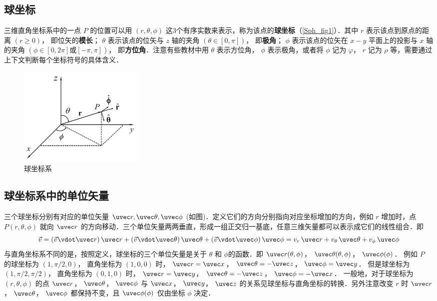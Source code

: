 

\subsection{球坐标}

三维直角坐标系中的一点 $P$ 的位置可以用 $(r,\theta ,\phi )$ 这3个有序实数来表示，称为该点的\textbf{球坐标}（\autoref{Sph_fig1}）．其中 $r$ 表示该点到原点的距离 $(r \ge 0)$， 即位矢的\textbf{模长}； $\theta$ 表示该点的位矢与 $z$ 轴的夹角 $(\theta  \in [0,\pi])$， 即\textbf{极角}； $\phi$ 表示该点的位矢在 $x - y$ 平面上的投影与 $x$ 轴的夹角 $(\phi  \in [0,2\pi]\text{或}[- \pi,\pi])$， 即\textbf{方位角}．注意有些教材中用 $\theta $ 表示方位角， $\phi $ 表示极角，或者将 $\phi $ 记为 $\varphi $，  $r$ 记为 $\rho $ 等，需要通过上下文判断每个坐标符号的具体含义．

\begin{figure}[ht]
\centering
\includegraphics[width=6cm]{./figures/Sph.pdf}
\caption{球坐标系}\label{Sph_fig1}
\end{figure}

\subsection{球坐标系中的单位矢量}
三个球坐标分别有对应的单位矢量 $\uvec r, \uvec\theta, \uvec\phi$ (如图)．定义它们的方向分别指向对应坐标增加的方向，例如 $r$ 增加时，点 $P(r,\theta ,\phi )$ 就向 $\uvec r$ 的方向移动．三个单位矢量两两垂直，形成一组正交归一基底，任意三维矢量都可以表示成它们的线性组合．即
\begin{equation}
\vec v = (\vec v \vdot \uvec r)\,\uvec r + (\vec v \vdot \uvec \theta)\,\uvec \theta  + (\vec v \vdot \uvec \phi)\,\uvec \phi  = {v_r}\,\uvec r + {v_\theta }\,\uvec \theta  + {v_\phi }\,\uvec \phi 
\end{equation}
与直角坐标系不同的是，按照定义，球坐标的三个单位矢量是关于 $\theta$ 和 $\phi$的函数．即
$\uvec r(\theta ,\phi )$，  $\uvec \theta (\theta ,\phi )$，  $\uvec \phi (\phi )$． 
例如 $P$ 的球坐标为 $(1,\pi/2,0)$， 直角坐标为 $(1,0,0)$ 时，
$\uvec r = \uvec x$， $\uvec \theta  =  - \uvec z$， $\uvec \phi  = \uvec y$． 
但是球坐标为 $(1,\pi/2,\pi/2)$， 直角坐标为 $(0,1,0)$ 时，
$\uvec r = \uvec y$， $\uvec \theta  =  - \uvec z$， $\uvec \phi  =  - \uvec x$． 
一般地，对于球坐标为 $(r,\theta ,\phi )$ 的点 $\uvec r$， $\uvec \theta $， $\uvec \phi $  与 $\uvec x$， $\uvec y $， $\uvec z $ 的关系见球坐标与直角坐标的转换．另外注意改变 $r$ 时 $\uvec r$， $\uvec \theta $， $\uvec \phi $ 都保持不变，且 $\uvec \phi (\phi )$ 仅由坐标 $\phi $ 决定．

